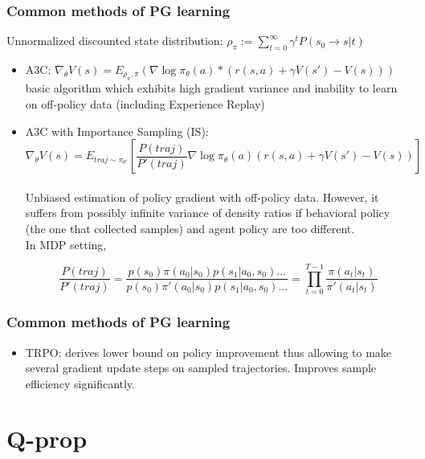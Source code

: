 \documentclass{beamer}
\begin{document}
\begin{frame}[t]
\frametitle{Common methods of PG learning}

Unnormalized discounted state distribution: $\rho_\pi :=  \sum_{t=0}^\infty \gamma^t P(s_0 \rightarrow s | t)$ 

\begin{itemize}

\item A3C: $\nabla_\theta V(s) = E_{\rho_\pi, \pi}(\nabla \log \pi_\theta (a) * (r(s,a) + \gamma V(s') - V(s)))$ 
\\basic algorithm which exhibits high gradient variance and inability to learn on off-policy data (including Experience Replay)

\item A3C with Importance Sampling (IS): \[ \nabla_\theta V(s) = E_{traj \sim \pi_{\theta'}} \left[ \dfrac{P(traj)}{P'(traj)} \nabla \log \pi_\theta (a) (r(s,a) + \gamma V(s') - V(s)) \right] \]
\\Unbiased estimation of policy gradient with off-policy data. However, it suffers from possibly infinite variance of density ratios if behavioral policy (the one that collected samples) and agent policy are too different.
\\In MDP setting, 

\begin{equation}
\dfrac{P(traj)}{P'(traj)} = \dfrac{p(s_0) \pi (a_0 | s_0) p(s_1 | a_0, s_0)
...} {p(s_0) \pi' (a_0 | s_0) p(s_1 | a_0, s_0)
...} = \prod_{t=0}^{T-1} \dfrac{\pi (a_t | s_t)} {\pi' (a_t | s_t)}
\end{equation}

\end{itemize}
\end{frame}

\begin{frame}[t]
\frametitle{Common methods of PG learning}
\begin{itemize}

\item TRPO: derives lower bound on policy improvement thus allowing to make several gradient update steps on sampled trajectories. Improves sample efficiency significantly.

\end{itemize}
\end{frame}

\section{Q-prop}
\end{document}
